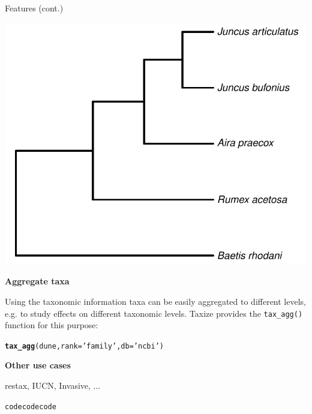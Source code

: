 \documentclass[final,t]{beamer}\usepackage[]{graphicx}\usepackage[]{color}
\makeatletter
\newcommand{\hlstr}[1]{\textcolor[rgb]{0.192,0.494,0.8}{#1}}%
\newcommand{\hlstd}[1]{\textcolor[rgb]{0.345,0.345,0.345}{#1}}%
\newcommand{\hlkwc}[1]{\textcolor[rgb]{0.333,0.667,0.333}{#1}}%
\newcommand{\hlkwd}[1]{\textcolor[rgb]{0.737,0.353,0.396}{\textbf{#1}}}%
\newenvironment{kframe}{%
 \def\at@end@of@kframe{}%
 \ifinner\ifhmode%
  \def\at@end@of@kframe{\end{minipage}}%
  \begin{minipage}{\columnwidth}%
 \fi\fi%
 \def\FrameCommand##1{\hskip\@totalleftmargin \hskip-\fboxsep
 \colorbox{shadecolor}{##1}\hskip-\fboxsep
     \hskip-\linewidth \hskip-\@totalleftmargin \hskip\columnwidth}%
 \MakeFramed {\advance\hsize-\width
   \@totalleftmargin\z@ \linewidth\hsize
   \@setminipage}}%
 {\par\unskip\endMakeFramed%
 \at@end@of@kframe}
\newenvironment{knitrout}{}{} %
\renewenvironment{knitrout}{}{\vspace{-1.8em}}
\makeatother
\begin{document}
\begin{frame}[fragile]
\begin{columns}[t]
\begin{column}{.485\linewidth}
\begin{block}{Features (cont.)}
\begin{knitrout}
{\centering \includegraphics[width=0.4\linewidth]{figure/classtree} 

}



\end{knitrout}
\vspace{2em}

\textcolor{i6bluedark}{\textbf{\large Aggregate taxa}}
        \vspace{0.5em}
        \par
        \begingroup
        \leftskip=2cm
        \noindent 
          Using the taxonomic information taxa can be easily aggregated to different levels, e.g. to study effects on different taxonomic levels.
          Taxize provides the \texttt{tax\_agg()} function for this purpose:
        \par
        \endgroup

\begin{knitrout}\footnotesize
{}\color{fgcolor}\begin{kframe}
\begin{alltt}
\hlkwd{tax_agg}\hlstd{(dune,} \hlkwc{rank} \hlstd{=} \hlstr{'family'}\hlstd{,} \hlkwc{db} \hlstd{=} \hlstr{'ncbi'}\hlstd{)}
\end{alltt}
\end{kframe}
\end{knitrout}
\vspace{2em}


\textcolor{i6bluedark}{\textbf{\large Other use cases}}
        \vspace{0.5em}
        \par
        \begingroup
        \leftskip=2cm
        \noindent 
          restax, IUCN, Invasive, ...
        \par
        \endgroup

\begin{knitrout}\footnotesize
{}\color{fgcolor}\begin{kframe}
\begin{alltt}
\hlstd{codecodecode}
\end{alltt}
\end{kframe}
\end{knitrout}
\vspace{2em}
      \end{block}
      

\end{column}
\end{columns}
\end{frame}
\end{document}
